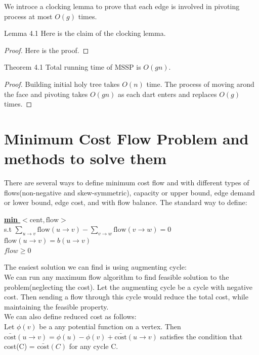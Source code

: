 \documentclass{article}
\begin{document}
We introce a clocking lemma to prove that each edge is involved in pivoting 
process at most $O(g)$ times.

\begin{oneshot}{Lemma 4.1}
Here is the claim of the clocking lemma.
\end{oneshot}
\begin{proof}
Here is the proof.
\end{proof}


\begin{oneshot}{Theorem 4.1}
Total running time of MSSP is $O(gn)$.
\end{oneshot}
\begin{proof}
Building initial holy tree takes $O(n)$ time. The process of moving arond the
face and pivoting takes $O(gn)$ as each dart enters and replaces $O(g)$ times.
\end{proof}


\section{Minimum Cost Flow Problem and methods to solve them}
There are several ways to define minimum cost flow and with different types of 
flows(non-negative and skew-symmetric), capacity or upper bound, edge demand or 
lower bound, edge cost, and with flow balance. The standard way to define:
\begin{center}
\begin{algorithm}
\textbf{\underline{min $< \text{cent}, \text{flow}>$}} \\
  s.t  $\sum \limits_{u \rightarrow v} \text{flow} 
  (u \rightarrow v) - \sum \limits_{v \rightarrow w} \text{flow} (v \rightarrow w)= 0 $  \\ 
  \qquad
       $\text{flow}(u \rightarrow v) = b(u \rightarrow v)$ \\ \qquad
       $flow \geq 0$
\end{algorithm}
\end{center}

The easiest solution we can find is using augmenting cycle: \\
We can run any maximum flow algorithm to find feasible solution to the 
problem(neglecting the cost). Let the augmenting cycle be a cycle with negative cost. 
Then sending a flow through this cycle would reduce the total cost, while 
maintaining the feasible property.  \\
We can also define reduced cost as follows: \\
Let $\phi(v)$ be a any potential function on a vertex. Then 
$\bar{\text{cost}}(u \rightarrow v) = \phi(u) - \phi(v) + \bar{\text{cost}} (u \rightarrow v)$ 
satisfies the condition that cost(C) =  $\bar{\text{cost}}(C)$ for any cycle C.\\
\end{document}
